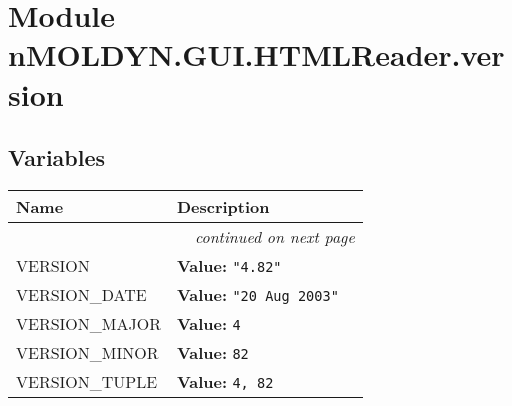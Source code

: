 %
%
%


\section{Module nMOLDYN.GUI.HTMLReader.version}

    \label{nMOLDYN:GUI:HTMLReader:version}


  \subsection{Variables}

    \vspace{-1cm}
\hspace{\varindent}\begin{longtable}{|p{\varnamewidth}|p{\vardescrwidth}|l}
\cline{1-2}
\cline{1-2} \centering \textbf{Name} & \centering \textbf{Description}& \\
\cline{1-2}
\endhead\cline{1-2}\multicolumn{3}{r}{\small\textit{continued on next page}}\\\endfoot\cline{1-2}
\endlastfoot\raggedright V\-E\-R\-S\-I\-O\-N\- & \raggedright \textbf{Value:} 
{\tt "4.82"}&\\
\cline{1-2}
\raggedright V\-E\-R\-S\-I\-O\-N\-\_\-D\-A\-T\-E\- & \raggedright \textbf{Value:} 
{\tt "20 Aug 2003"}&\\
\cline{1-2}
\raggedright V\-E\-R\-S\-I\-O\-N\-\_\-M\-A\-J\-O\-R\- & \raggedright \textbf{Value:} 
{\tt 4}&\\
\cline{1-2}
\raggedright V\-E\-R\-S\-I\-O\-N\-\_\-M\-I\-N\-O\-R\- & \raggedright \textbf{Value:} 
{\tt 82}&\\
\cline{1-2}
\raggedright V\-E\-R\-S\-I\-O\-N\-\_\-T\-U\-P\-L\-E\- & \raggedright \textbf{Value:} 
{\tt 4, 82}&\\
\cline{1-2}
\end{longtable}

